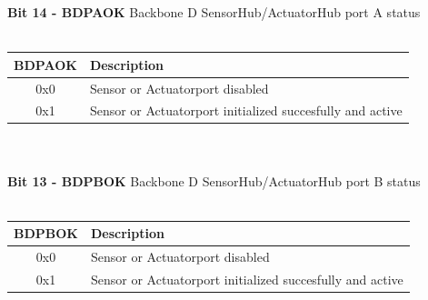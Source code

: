 \textbf{Bit 14 - BDPAOK} Backbone D SensorHub/ActuatorHub port A status\\\\
\begin{tabular}{|c|l|}
    \hline
   BDPAOK & Description\\ \hline
   0x0 & Sensor or Actuatorport disabled\\ \hline
   0x1 & Sensor or Actuatorport initialized succesfully and active\\ \hline
\end{tabular}\\\\
\textbf{Bit 13 - BDPBOK} Backbone D SensorHub/ActuatorHub port B status\\\\
\begin{tabular}{|c|l|}
    \hline
   BDPBOK & Description\\ \hline
   0x0 & Sensor or Actuatorport disabled\\ \hline
   0x1 & Sensor or Actuatorport initialized succesfully and active\\ \hline
\end{tabular}\\\\
